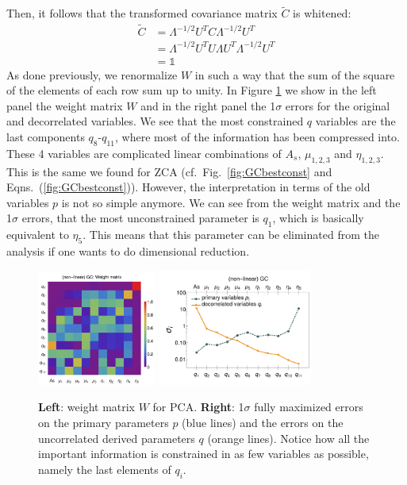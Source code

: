 Then, it follows that the transformed covariance matrix $\tilde{C}$ is whitened:
\begin{align}
\tilde{C} & =\Lambda^{-1/2}U^{T}C\Lambda^{-1/2}U^{T}\\
& =\Lambda^{-1/2}U^{T}U\Lambda U^{T}\Lambda^{-1/2}U^{T}\\
& =\mathbb{1}
\end{align}
As done previously, we renormalize $W$ in such a way that the sum of the square of the elements of each row sum up to
unity.
In Figure \ref{fig:PCA-GCnlhs} we show in the left panel the weight matrix $W$ and in the right panel the 1$\sigma$ errors for the original
and decorrelated variables. We see that the most constrained $q$ variables are the last components $q_8$-$q_{11}$, where most
of the information has been compressed into. These 4 variables are complicated linear combinations of $A_s$, $\mu_{1,2,3}$ 
and $\eta_{1,2,3}$. This is the same we found for ZCA (cf.\ Fig.\ \ref{fig:GCbestconst} and Eqns.\ (\ref{fig:GCbestconst})). However, the interpretation
in terms of the old variables $p$ is not so simple anymore. We can see from the weight matrix and the 1$\sigma$
errors, that the most unconstrained parameter is $q_1$, which is basically equivalent to $\eta_5$. This means that this parameter can be
eliminated from the analysis if one wants to do dimensional reduction.
\begin{figure}[htbp]
	\includegraphics[width=0.35\textwidth]{Chapters/linear-nonlinear-MG-forecasts/figures/Decorrelations-GC/Weight_Matrix_PCA_SquareNorm--_fiducialMGBin3_Euclid_GC_nonlinearPk__Zhao_.pdf}
	\includegraphics[width=0.45\textwidth]{Chapters/linear-nonlinear-MG-forecasts/figures/Decorrelations-GC/Errors_at_par_index_i--_PCA_SquareNorm--fiducialMGBin3_Euclid_GC_nonlinearPk__Zhao_.pdf}
	\caption[PCA decorrelation: Weight matrix and uncorrelated errors.]{\textbf{Left}: weight matrix $W$ for PCA. \textbf{Right}: 1$\sigma$ fully maximized errors on
		the primary parameters $p$ (blue lines) and the errors on the uncorrelated
		derived parameters $q$ (orange lines). Notice how all the important information is constrained in as few variables as possible,
		namely the last elements of $q_i$.
	}\label{fig:PCA-GCnlhs}
\end{figure}


